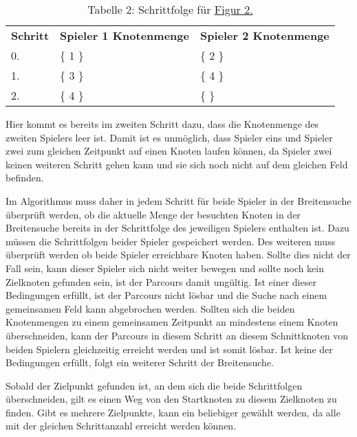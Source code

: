 \documentclass[a4paper,10pt,ngerman]{scrartcl}
\begin{document}
    \begin{table}[!h]
        \centering
        \begin{tabular}{lll}
            \textbf{Schritt} & \textbf{Spieler 1 Knotenmenge} & \textbf{Spieler 2 Knotenmenge} \\
            0.               & \{ 1 \}                        & \{ 2 \}                        \\
            1.               & \{ 3 \}                        & \{ 4 \}                        \\
            2.               & \{ 4 \}                        & \{   \}                           \\
        \end{tabular}
        \caption{Tabelle 2: Schrittfolge für \hyperref[fig:Figure2]{Figur 2.}}
        \label{tab:Table2}
    \end{table}

    Hier kommt es bereits im zweiten Schritt dazu, dass die Knotenmenge des zweiten Spielers leer ist.
    Damit ist es unmöglich,
    dass Spieler eins und Spieler zwei zum gleichen Zeitpunkt auf einen Knoten laufen können,
    da Spieler zwei keinen weiteren Schritt gehen kann und sie sich noch nicht auf dem gleichen Feld befinden.

    Im Algorithmus muss daher in jedem Schritt für beide Spieler in der Breitensuche überprüft werden,
    ob die aktuelle Menge der besuchten Knoten in der Breitensuche
    bereits in der Schrittfolge des jeweiligen Spielers enthalten ist.
    Dazu müssen die Schrittfolgen beider Spieler gespeichert werden.
    Des weiteren muss überprüft werden ob beide Spieler erreichbare Knoten haben.
    Sollte dies nicht der Fall sein, kann dieser Spieler sich nicht weiter bewegen
    und sollte noch kein Zielknoten gefunden sein, ist der Parcours damit ungültig.
    Ist einer dieser Bedingungen erfüllt, ist der Parcours nicht lösbar
    und die Suche nach einem gemeinsamen Feld kann abgebrochen werden.
    Sollten sich die beiden Knotenmengen zu einem gemeinsamen Zeitpunkt an mindestens einem Knoten überschneiden,
    kann der Parcours in diesem Schritt an diesem Schnittknoten
    von beiden Spielern gleichzeitig erreicht werden und ist somit lösbar.
    Ist keine der Bedingungen erfüllt,
    folgt ein weiterer Schritt der Breitensuche.

    Sobald der Zielpunkt gefunden ist,
    an dem sich die beide Schrittfolgen überschneiden,
    gilt es einen Weg von den Startknoten zu diesem Zielknoten zu finden.
    Gibt es mehrere Zielpunkte, kann ein beliebiger gewählt werden,
    da alle mit der gleichen Schrittanzahl erreicht werden können.
\end{document}
